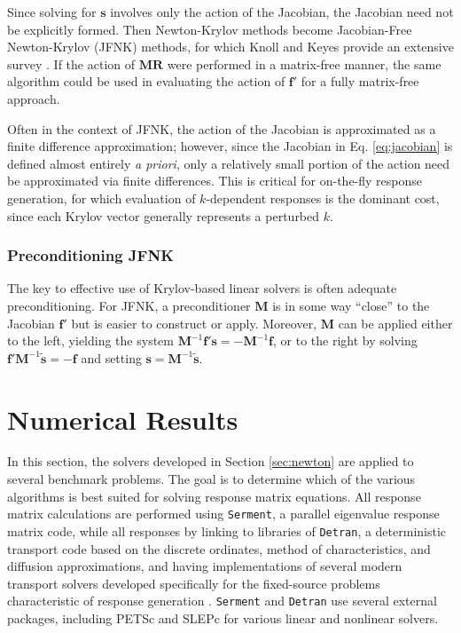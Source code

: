 Since solving for $\mathbf{s}$ involves only the action of the 
Jacobian, the Jacobian need not be explicitly formed.  Then 
Newton-Krylov methods become  Jacobian-Free Newton-Krylov (JFNK) 
methods, for which Knoll and Keyes provide an extensive survey 
\cite{knoll2004jfn}.  If the action of $\mathbf{MR}$ were performed 
in a matrix-free 
manner, the same algorithm could be used in evaluating the 
action of $\mathbf{f}'$ for a fully matrix-free approach.

Often in the context of JFNK, the action 
of the Jacobian is approximated as a finite difference 
approximation; however, since the Jacobian in Eq. \ref{eq:jacobian} 
is defined almost entirely {\it a priori}, only a relatively small 
portion of the action need be approximated via finite differences.  
This is critical for on-the-fly response generation, for which
evaluation of $k$-dependent responses is the dominant cost, since
each Krylov vector generally represents a perturbed $k$.

\subsubsection{Preconditioning JFNK}

The key to effective use of Krylov-based linear solvers is often 
adequate preconditioning.  For JFNK, a preconditioner $\mathbf{M}$ is 
in some way ``close'' to the Jacobian $\mathbf{f}'$ but is easier to 
construct or apply.  Moreover, $\mathbf{M}$ can be applied either 
to the left, yielding the 
system $\mathbf{M}^{-1}\mathbf{f}'\mathbf{s}=-\mathbf{M}^{-1}\mathbf{f}$, or 
to the right by solving 
$\mathbf{f}' \mathbf{M}^{-1} \tilde{\mathbf{s}} = -\mathbf{f}$ and 
setting $\mathbf{s} =  \mathbf{M}^{-1} \tilde{\mathbf{s}} $.

\section{Numerical Results}
\label{sec:results}


In this section, the solvers developed in 
Section \ref{sec:newton} are applied to several benchmark
problems.  The goal is to determine
which of the various algorithms is best suited for solving 
response matrix equations.  All response matrix calculations are performed 
using {\tt Serment}, a parallel eigenvalue response matrix code,
while all responses by linking to libraries of {\tt Detran}, a deterministic 
transport code based on the discrete ordinates, method of characteristics, 
and diffusion approximations, and having implementations of 
several modern transport solvers developed specifically 
for the fixed-source problems characteristic of 
response generation \cite{detran}.  {\tt Serment} and {\tt Detran} use 
several external packages, including PETSc \cite{petsc} and 
SLEPc \cite{slepc} for various linear and nonlinear solvers.

